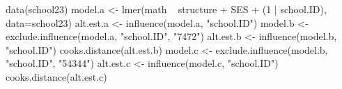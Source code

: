 data(school23)
model.a <- lmer(math ~ structure + SES + (1 | school.ID), data=school23)
alt.est.a <- influence(model.a, "school.ID")
model.b <- exclude.influence(model.a, "school.ID", "7472")
alt.est.b <- influence(model.b, "school.ID")
cooks.distance(alt.est.b)
model.c <- exclude.influence(model.b, "school.ID", "54344")
alt.est.c <- influence(model.c, "school.ID")
cooks.distance(alt.est.c)
